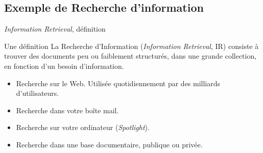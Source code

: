 \subsection{Exemple de Recherche d'information}
\begin{frame}{\textit{Information Retrieval}, définition}

  \vfill
  \begin{defblock}{Une définition}
    La \alert{Recherche d'Information} (\textit{Information Retrieval}, IR) consiste à
    trouver des \alert{documents} peu ou faiblement structurés, dans une grande \alert{collection},
    en fonction d'un \alert{besoin d'information}.
  \end{defblock}

  \vfill
  \begin{itemize} 
      \setlength{\itemsep}{8pt}
    \item Recherche sur le Web. Utilisée quotidiennement par des milliards d'utilisateurs.
    \item Recherche dans votre boîte mail.
    \item Recherche sur votre ordinateur (\textit{Spotlight}).
    \item Recherche dans une base documentaire, publique ou privée.
  \end{itemize}
  \vfill
\end{frame}

